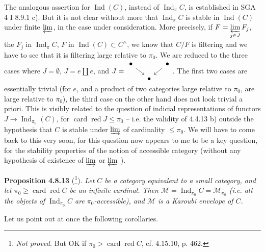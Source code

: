 \documentclass[11pt]{article}
\newcommand{\msp}[1]{\marginpar{\footnotesize [#1]}}
\newcommand{\Ind}{\operatorname{Ind}}
\newcommand{\card}{\operatorname{card}}
\newcommand{\red}{\operatorname{\text{red}}}
\newcommand{\cM}{\mathcal{M}}
\begin{document}
The analogous assertion for $\Ind(C)$, instead of $\Ind_{\pi}C$, is established in SGA 4 I 8.9.1 c). But it is not clear without more that $\Ind_{\pi}C$ is stable in $\Ind(C)$ under finite $\varprojlim$, in the case under consideration. More precisely, if $F = \varprojlim\limits_{j\in J} F_j$, the $F_j$ in $\Ind_{\pi}C$,
\msp{page 212}
$F$ in $\Ind(C) \subset C^{\wedge}$, we know that $C/F$ is filtering and we have to see that it is filtering large relative to $\pi_0$. We are reduced to the three cases where $J = \emptyset$, $J = e \amalg e$, and $J = \vcenter{\hbox{\begin{tikzcd}[ampersand replacement=\&, column sep=small, row sep=small]
\bullet \arrow[dr] \& \& \bullet \arrow[dl] \\
\& \bullet \&
\end{tikzcd}}}$. The first two cases are essentially trivial (for $e$, and a product of two categories large relative to $\pi_0$, are large relative to $\pi_0$), the third case on the other hand does not look trivial a priori. This is visibly related to the question of indicial representations of functors $J \longrightarrow \Ind_{\pi_0}(C)$, for $\card\red J \leqslant \pi_0$ -- i.e. the validity of 4.4.13 b) outside the hypothesis that $C$ is stable under $\varinjlim$ of cardinality $\leqslant \pi_0$. We will have to come back to this very soon, for this question now appears to me to be a key question, for the stability properties of the notion of accessible category (without any hypothesis of existence of $\varinjlim$ or $\varprojlim$ ). %

\textbf{Proposition 4.8.13} (\footnote[89]{\textit{Not proved.} But OK if $\pi_0 > \card\red C$, cf. 4.15.10, p. 462.}). \textit{Let $C$ be a category equivalent to a small category, and let $\pi_0 \geqslant \card\red C$ be an infinite cardinal. Then $\cM = \Ind_{\pi_0}C = \cM_{\pi_0}$ (i.e. all the objects of $\Ind_{\pi_0}C$ are $\pi_0$-accessible), and $\cM$ is a Karoubi envelope of $C$.}

\msp{page 213}

Let us point out at once the following corollaries.
\end{document}
